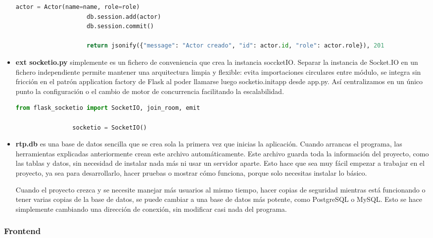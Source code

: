\begin{itemize}
\begin{lstlisting}[language=Python, style=custom]
                    actor = Actor(name=name, role=role)
                    db.session.add(actor)
                    db.session.commit()

                    return jsonify({"message": "Actor creado", "id": actor.id, "role": actor.role}), 201

            \end{lstlisting}

    \item \textbf{ext socketio.py} simplemente es un fichero de conveniencia que crea la instancia soccketIO.
            Separar la instancia de Socket.IO en un fichero independiente permite mantener una arquitectura limpia y flexible: evita importaciones circulares entre módulo, se integra sin fricción en el patrón application factory de Flask al poder llamarse luego socketio.initapp desde app.py. Así centralizamos en un único punto la configuración o el cambio de motor de concurrencia facilitando la escalabilidad.
            \begin{lstlisting}[language=Python, style=custom]
                from flask_socketio import SocketIO, join_room, emit

                socketio = SocketIO()
            \end{lstlisting}


    \item \textbf{rtp.db} es una base de datos sencilla que se crea sola la primera vez que inicias la aplicación. Cuando arrancas el programa, las herramientas explicadas anteriormente crean este archivo automáticamente. Este archivo guarda toda la información del proyecto, como las tablas y datos, sin necesidad de instalar nada más ni usar un servidor aparte. Esto hace que sea muy fácil empezar a trabajar en el proyecto, ya sea para desarrollarlo, hacer pruebas o mostrar cómo funciona, porque solo necesitas instalar lo básico.

        Cuando el proyecto crezca y se necesite manejar más usuarios al mismo tiempo, hacer copias de seguridad mientras está funcionando o tener varias copias de la base de datos, se puede cambiar a una base de datos más potente, como PostgreSQL o MySQL. Esto se hace simplemente cambiando una dirección de conexión, sin modificar casi nada del programa.
\end{itemize}

\subsubsection{Frontend}
\label{subsubsec:Frontend}

